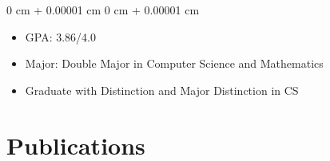 \documentclass[10pt, letterpaper]{article}
\newenvironment{highlights}{
    \begin{itemize}[
        topsep=0.10 cm,
        parsep=0.10 cm,
        partopsep=0pt,
        itemsep=0pt,
        leftmargin=0 cm + 10pt
    ]
}{
    \end{itemize}
} %
\newenvironment{onecolentry}{
    \begin{adjustwidth}{
        0 cm + 0.00001 cm
    }{
        0 cm + 0.00001 cm
    }
}{
    \end{adjustwidth}
} %
\begin{document}
        \vspace{0.10 cm}
        \begin{onecolentry}
            \begin{highlights}
                \item GPA: 3.86/4.0 
                \item Major: Double Major in Computer Science and Mathematics
                \item Graduate with Distinction and Major Distinction in CS
            \end{highlights}
        \end{onecolentry}



    \section{Publications}
\end{document}

